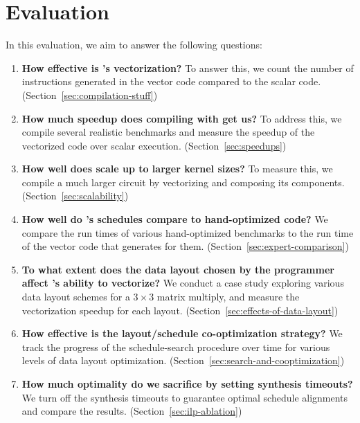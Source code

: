 \section{Evaluation}\label{sec:eval}


In this evaluation, we aim to answer the following questions:

\begin{enumerate}
    \item {\bf How effective is \system's vectorization?} To answer this, we count the number of instructions generated in the vector code compared to the scalar code. (Section~\ref{sec:compilation-stuff})
    \item {\bf How much speedup does compiling with \system get us?} To address this, we compile several realistic benchmarks and measure the speedup of the vectorized code over scalar execution. (Section~\ref{sec:speedups})
    \item {\bf How well does \system scale up to larger kernel sizes?} To measure this, we compile a much larger circuit by vectorizing and composing its components. (Section~\ref{sec:scalability}) 
    \item {\bf How well do \system's schedules compare to hand-optimized code?} We compare the run times of various hand-optimized benchmarks to the run time of the vector code that \system generates for them. (Section~\ref{sec:expert-comparison})
    \item {\bf To what extent does the data layout chosen by the programmer affect \system's ability to vectorize?} We conduct a case study exploring various data layout schemes for a $3\times 3$ matrix multiply, and measure the vectorization speedup for each layout. (Section~\ref{sec:effects-of-data-layout})
   \item {\bf How effective is the layout/schedule co-optimization strategy?} We track the progress of the schedule-search procedure over time for various levels of data layout optimization. (Section~\ref{sec:search-and-cooptimization})
   \item {\bf How much optimality do we sacrifice by setting synthesis timeouts?} We turn off the synthesis timeouts to guarantee optimal schedule alignments and compare the results. (Section~\ref{sec:ilp-ablation})
\end{enumerate}

